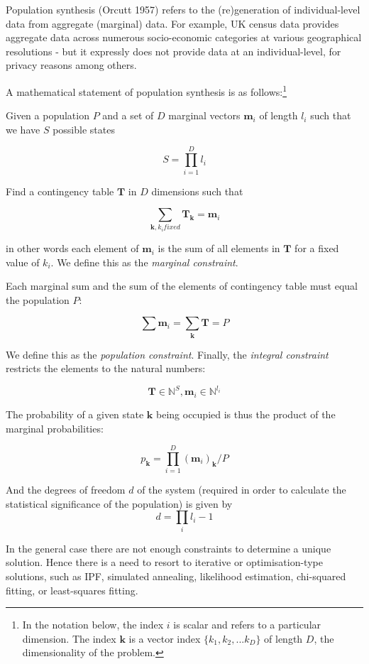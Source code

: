 \documentclass[]{article}
\let\rmarkdownfootnote\footnote%
\def\footnote{\protect\rmarkdownfootnote}
\begin{document}
Population synthesis (Orcutt 1957) refers to the (re)generation of
individual-level data from aggregate (marginal) data. For example, UK
census data provides aggregate data across numerous socio-economic
categories at various geographical resolutions - but it expressly does
not provide data at an individual-level, for privacy reasons among
others.

A mathematical statement of population synthesis is as
follows:\footnote{In the notation below, the index \(i\) is scalar and
  refers to a particular dimension. The index \(\mathbf{k}\) is a vector
  index \(\{k_1, k_2,...k_D\}\) of length \(D\), the dimensionality of
  the problem.}

Given a population \(P\) and a set of \(D\) marginal vectors
\(\mathbf{m}_i\) of length \(l_i\) such that we have \(S\) possible
states

\[S=\prod\limits_{i=1}^{D}l_i\]

Find a contingency table \(\mathbf T\) in \(D\) dimensions such that

\[\sum\limits_{\mathbf{k}, k_i fixed} \mathbf{T}_\mathbf{k} = \mathbf{m}_i\]

in other words each element of \(\mathbf{m}_i\) is the sum of all
elements in \(\mathbf{T}\) for a fixed value of \(k_i\). We define this
as the \emph{marginal constraint}.

Each marginal sum and the sum of the elements of contingency table must
equal the population \(P\):

\[\sum\limits \mathbf{m}_{i} = \sum\limits_\mathbf{k} \mathbf{T} = P\]

We define this as the \emph{population constraint}. Finally, the
\emph{integral constraint} restricts the elements to the natural
numbers:

\[{\mathbf{T} \in \mathbb{N}^S,\mathbf{m}_i} \in \mathbb{N}^{l_i}\]

The probability of a given state \(\mathbf{k}\) being occupied is thus
the product of the marginal probabilities:

\[p_{\mathbf{k}} = \prod\limits_{i=1}^{D}(\mathbf{m}_i)_\mathbf{k}/P\]

And the degrees of freedom \(d\) of the system (required in order to
calculate the statistical significance of the population) is given by
\[d=\prod\limits_{i}l_i-1\]

In the general case there are not enough constraints to determine a
unique solution. Hence there is a need to resort to iterative or
optimisation-type solutions, such as IPF, simulated annealing,
likelihood estimation, chi-squared fitting, or least-squares fitting.
\end{document}
